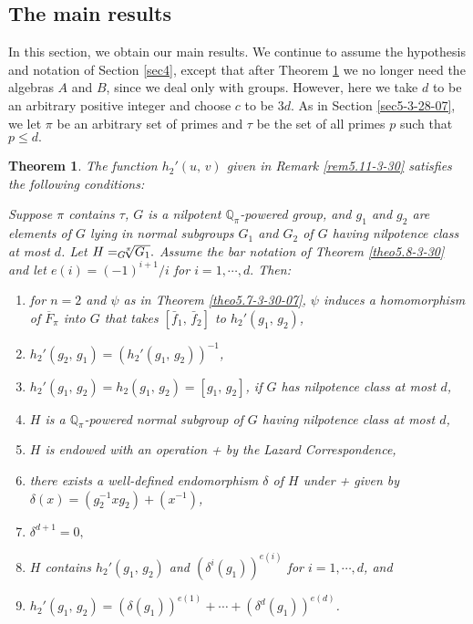 \documentclass[mathscr]{amsart}
\theoremstyle{theorem}
\newtheorem{theorem}{Theorem}[section]
\theoremstyle{definition}
\numberwithin{equation}{section}
\def \({\left(}
\def \){\right)}
\def\[{\left[}
\def\]{\right]}
\def\Q{\mathbb{Q}}
\begin{document}
\begin{center}
\section{The main results}
\label{sec6}
\end{center}

In this section, we obtain our main results. We continue to assume
the hypothesis and notation of Section \ref{sec4}, except that after
Theorem \ref{theo6.1-4-2} we no longer need the algebras $A$ and
$B$, since we deal only with groups. However, here we take $d$ to be
an arbitrary positive integer and choose $c$ to be $3d$. As in
Section \ref{sec5-3-28-07}, we let $\pi$ be an arbitrary set of
primes %
and $\tau$ be the set of all primes $p$ such that $p\leq d.$
\\

\begin{theorem}\label{theo6.1-4-2}
The function $h_2'(u,\,v)$ given in Remark \ref{rem5.11-3-30}
satisfies the following conditions:

Suppose $\pi$ contains $\tau$, $G$ is a nilpotent $\Q_\pi$-powered
group, and $g_1$ and $g_2$ are elements of $G$ lying in normal
subgroups $G_1$ and $G_2$ of $G$ having nilpotence class at most
$d$. Let $H=_G\hspace*{-0.2cm}\sqrt[\pi]{G_1}.$ Assume the bar
notation of Theorem \ref{theo5.8-3-30} and let $e(i)=(-1)^{i+1}/i$
for $i=1,\cdots,d.$ Then:
\begin{enumerate}
\item[(a)] for $n=2$ and $\psi$ as in Theorem \ref{theo5.7-3-30-07}, $\psi$
induces a homomorphism of $\overline{F}_\pi$ into $G$ that takes
$\[\bar f_1,\,\bar f_2\]$ to $h_2'(g_1,\,g_2)$,
\item[(b)] $h_2'(g_2,\,g_1)=\(h_2'(g_1,\,g_2)\)^{-1}$,
\item[(c)] $h_2'(g_1,\,g_2)=h_2(g_1,\,g_2)=[g_1,\,g_2]$, if $G$ has
nilpotence class at most $d$,
\item[(d)] $H$ is a $\Q_\pi$-powered normal subgroup of $G$ having nilpotence
class at most $d$,
\item[(e)]  $H$ is endowed with an operation + by the Lazard
Correspondence,
\item[(f)] there exists a well-defined endomorphism $\delta$ of $H$
under + given by $\delta(x)=\(g_2^{-1}xg_2\)+\(x^{-1}\)$,
\item[(g)] $\delta^{d+1}=0,$
\item[(h)] $H$ contains $h_2'(g_1,\,g_2)$ and
$\(\delta^i\(g_1\)\)^{e(i)}$ for $i=1,\cdots,d$, and
\item[(j)] $h_2'(g_1,\,g_2)=\(\delta(g_1)\)^{e(1)}+\cdots+
\(\delta^d(g_1)\)^{e(d)}$.
\end{enumerate}
\end{theorem}
\end{document}

